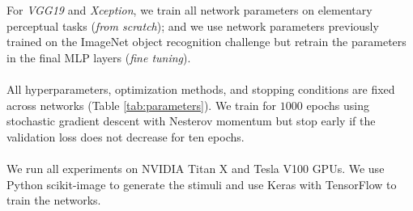 For \emph{VGG19} and \emph{Xception}, we train all network parameters on elementary perceptual tasks (\emph{from scratch}); and we use network parameters previously trained on the ImageNet object recognition challenge but retrain the parameters in the final MLP layers (\emph{fine tuning}). 
\\~\\
 All hyperparameters, optimization methods, and stopping conditions are fixed across networks (Table \ref{tab:parameters}). We train for $1000$ epochs using stochastic gradient descent with Nesterov momentum but stop early if the validation loss does not decrease for ten epochs. 
\\~\\
 We run all experiments on NVIDIA Titan X and Tesla V100 GPUs. We use Python scikit-image to generate the stimuli and use Keras with TensorFlow to train the networks. %

